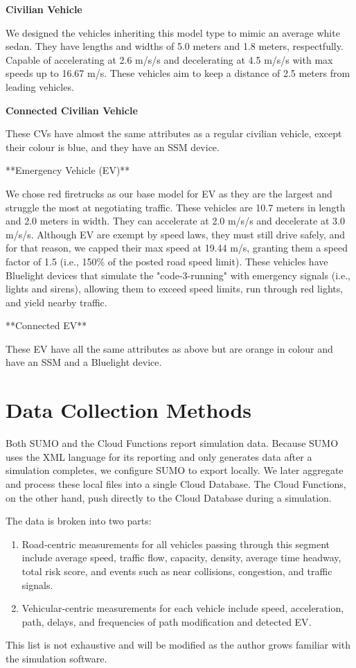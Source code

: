 \textbf{Civilian Vehicle}

We designed the vehicles inheriting this model type to mimic an average white sedan. They have lengths and widths of 5.0 meters and 1.8 meters, respectfully. Capable of accelerating at 2.6 m/s/s and decelerating at 4.5 m/s/s with max speeds up to 16.67 m/s. These vehicles aim to keep a distance of 2.5 meters from leading vehicles.

\textbf{Connected Civilian Vehicle}

These CVs have almost the same attributes as a regular civilian vehicle, except their colour is blue, and they have an SSM device.

**Emergency Vehicle (\acrshort{EV})**

We chose red firetrucks as our base model for \acrshort{EV} as they are the largest and struggle the most at negotiating traffic. These vehicles are 10.7 meters in length and 2.0 meters in width. They can accelerate at 2.0 m/s/s and decelerate at 3.0 m/s/s. Although \acrshort{EV} are exempt by speed laws, they must still drive safely, and for that reason, we capped their max speed at 19.44 m/s, granting them a speed factor of 1.5 (i.e., 150\% of the posted road speed limit). These vehicles have Bluelight devices that simulate the "code-3-running" with emergency signals (i.e., lights and sirens), allowing them to exceed speed lim\acrshort{its}, run through red lights, and yield nearby traffic.

**Connected \acrshort{EV}**

These \acrshort{EV} have all the same attributes as above but are orange in colour and have an SSM and a Bluelight device.

\section{Data Collection Methods}

Both SUMO and the Cloud Functions report simulation data. Because SUMO uses the XML language for \acrshort{its} reporting and only generates data after a simulation completes, we configure SUMO to export locally. We later aggregate and process these local files into a single Cloud Database. The Cloud Functions, on the other hand, push directly to the Cloud Database during a simulation.

The data is broken into two parts:
\begin{enumerate}

\item Road-centric measurements for all vehicles passing through this segment include average speed, traffic flow, capacity, density, average time headway, total risk score, and events such as near collisions, congestion, and traffic signals.

\item Vehicular-centric measurements for each vehicle include speed, acceleration, path, delays, and frequencies of path modification and detected \acrshort{EV}.

\end{enumerate}
This list is not exhaustive and will be modified as the author grows familiar with the simulation software.

